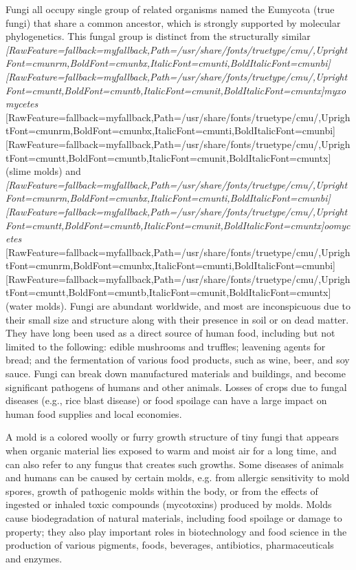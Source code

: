Fungi all occupy single group of related organisms named the Eumycota (true fungi) that share a common ancestor, which is strongly supported by molecular phylogenetics. This fungal group is distinct from the structurally similar {\itshape \allowbreak{}\setmainfont{cmunti.ttf}[RawFeature={fallback=myfallback},Path=/usr/share/fonts/truetype/cmu/,UprightFont=cmunrm,BoldFont=cmunbx,ItalicFont=cmunti,BoldItalicFont=cmunbi]\setmonofont{cmunti.ttf}[RawFeature={fallback=myfallback},Path=/usr/share/fonts/truetype/cmu/,UprightFont=cmuntt,BoldFont=cmuntb,ItalicFont=cmunit,BoldItalicFont=cmuntx]\itshape myxomycetes}{$\text{ }$}\allowbreak{}\setmainfont{cmunrm.ttf}[RawFeature={fallback=myfallback},Path=/usr/share/fonts/truetype/cmu/,UprightFont=cmunrm,BoldFont=cmunbx,ItalicFont=cmunti,BoldItalicFont=cmunbi]\setmonofont{cmunrm.ttf}[RawFeature={fallback=myfallback},Path=/usr/share/fonts/truetype/cmu/,UprightFont=cmuntt,BoldFont=cmuntb,ItalicFont=cmunit,BoldItalicFont=cmuntx] (slime molds) and {\itshape \allowbreak{}\setmainfont{cmunti.ttf}[RawFeature={fallback=myfallback},Path=/usr/share/fonts/truetype/cmu/,UprightFont=cmunrm,BoldFont=cmunbx,ItalicFont=cmunti,BoldItalicFont=cmunbi]\setmonofont{cmunti.ttf}[RawFeature={fallback=myfallback},Path=/usr/share/fonts/truetype/cmu/,UprightFont=cmuntt,BoldFont=cmuntb,ItalicFont=cmunit,BoldItalicFont=cmuntx]\itshape oomycetes}{$\text{ }$}\allowbreak{}\setmainfont{cmunrm.ttf}[RawFeature={fallback=myfallback},Path=/usr/share/fonts/truetype/cmu/,UprightFont=cmunrm,BoldFont=cmunbx,ItalicFont=cmunti,BoldItalicFont=cmunbi]\setmonofont{cmunrm.ttf}[RawFeature={fallback=myfallback},Path=/usr/share/fonts/truetype/cmu/,UprightFont=cmuntt,BoldFont=cmuntb,ItalicFont=cmunit,BoldItalicFont=cmuntx] (water molds). Fungi are abundant worldwide, and most are inconspicuous due to their small size and structure along with their presence in soil or on dead matter. They have long been used as a direct source of human food, including but not limited to the following: edible mushrooms and truffles; leavening agents for bread; and the fermentation of various food products, such as wine, beer, and soy sauce. Fungi can break down manufactured materials and buildings, and become significant pathogens of humans and other animals. Losses of crops due to fungal diseases (e.g., rice blast disease) or food spoilage can have a large impact on human food supplies and local economies.

A mold is a colored woolly or furry growth structure of tiny fungi that appears when organic material lies exposed to warm and moist air for a long time, and can also refer to any fungus that creates such growths. Some diseases of animals and humans can be caused by certain molds, e.g. from allergic sensitivity to mold spores, growth of pathogenic molds within the body, or from the effects of ingested or inhaled toxic compounds (mycotoxins) produced by molds. Molds cause biodegradation of natural materials, including food spoilage or damage to property; they also play important roles in biotechnology and food science in the production of various pigments, foods, beverages, antibiotics, pharmaceuticals and enzymes.

